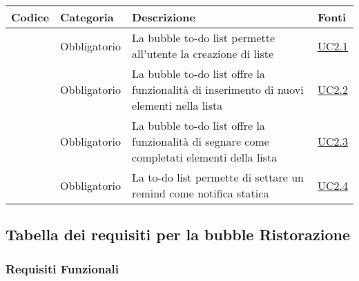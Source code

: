 \begin{longtable}{|P{1.5cm}|P{3cm}|P{6cm}|P{2.5cm}|}
	\hline \textbf{Codice} & \textbf{Categoria} & \textbf{Descrizione} & \textbf{Fonti} \\
	\hline \RequisitoObF\label{L17} & Obbligatorio & La bubble to-do list permette all’utente la creazione di liste & \hyperref[UC2.1]{UC2.1} \\
	\hline \RequisitoObF\label{L18} & Obbligatorio & La bubble to-do list offre la funzionalità di inserimento di nuovi elementi nella lista & \hyperref[UC2.2]{UC2.2} \\
	\hline \RequisitoObF\label{L19} & Obbligatorio & La bubble to-do list offre la funzionalità di segnare come completati elementi della lista & \hyperref[UC2.3]{UC2.3} \\
	\hline \RequisitoObF\label{L20} & Obbligatorio & La to-do list permette di settare un remind come notifica statica & \hyperref[UC2.4]{UC2.4} \\
	\hline
\end{longtable}

\subsection{Tabella dei requisiti per la bubble Ristorazione}

\subsubsection{Requisiti Funzionali}

